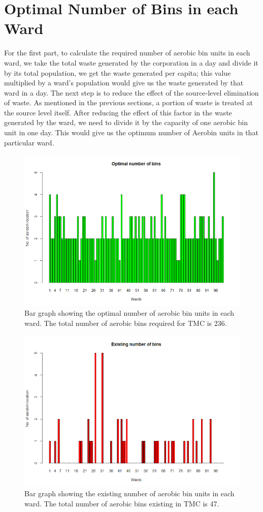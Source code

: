 \documentclass[12pt,a4paper]{  report}
\begin{document}
\section{Optimal Number of Bins in each Ward}
For the first part, to calculate the required number of aerobic bin units in each ward, we take the total waste generated by the corporation in a day and divide it by its total population, we get the waste generated per capita; this value multiplied by a ward’s population would give us the waste generated by that ward in a day. The next step is to reduce the effect of the source-level elimination of waste. As mentioned in the previous sections, a portion of waste is treated at the source level itself. After reducing the effect of this factor in the waste generated by the ward, we need to divide it by the capacity of one aerobic bin unit in one day. This would give us the optimum number of Aerobin units in that particular ward.

\begin{figure}
	\centering
	\includegraphics[width=0.7\linewidth]{optimal}
	\caption{Bar graph showing the optimal number of aerobic bin units in each ward. The total number of aerobic bins required for TMC is 236.}
	\label{fig:optimal}
\end{figure}
	
\begin{figure}
	\centering
	\includegraphics[width=0.7\linewidth]{exis}
	\caption{Bar graph showing the existing number of aerobic bin units in each ward. The total number of aerobic bins existing in TMC is 47.}
	\label{fig:exis}
\end{figure}
\end{document}
